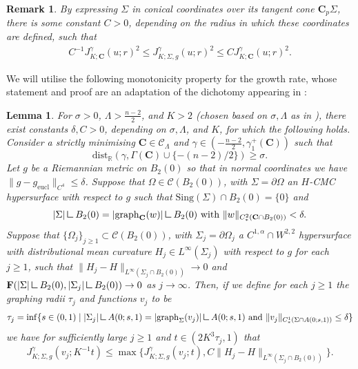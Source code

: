 \documentclass[12pt]{article}
\newtheorem{remark}{Remark}
\newtheorem{lemma}{Lemma}
\newcommand{\mres}{\mathbin{\vrule height 1.6ex depth 0pt width
0.13ex\vrule height 0.13ex depth 0pt width 1.3ex}}
\begin{document}
\begin{remark}\label{rem: J on cone to J on cmc} By expressing $\Sigma$ in conical coordinates over its tangent cone $\mathbf{C}_p\Sigma$, there is some constant $C > 0$, depending on the radius in which these coordinates are defined, such that
\begin{align*}
       C^{-1}J^{\gamma}_{K;\mathbf{C}}(u;r)^2 \leq J^{\gamma}_{K;\Sigma,g}(u;r)^2
\leq CJ^{\gamma}_{K;\mathbf{C}}(u;r)^2.
   \end{align*}
\end{remark}

We will utilise the following monotonicity property for the growth rate, whose statement and proof are an adaptation of the dichotomy appearing in \cite[Lemma F.5]{LW25}:

\begin{lemma}\label{lem: dichotomy adapted}
    For $\sigma > 0$, $\Lambda>\frac{n-2}{2}$, and $K > 2$ (chosen based on $\sigma,\Lambda$ as in \cite[Corollary 6.2]{LW25}), there exist constants $\delta, C > 0$, depending on $\sigma, \Lambda$, and $K$, for which the following holds. Consider a strictly minimising $\mathbf{C} \in \mathscr{C}_\Lambda$ and $\gamma \in (-\frac{n-2}{2}, \gamma_1^+(\mathbf{C}))$ such that
    $$
    \mathrm{dist}_{\mathbb{R}}\left(\gamma, \Gamma(\mathbf{C}) \cup \{-(n - 2)/2\}\right) \geq \sigma. 
    $$
    Let $g$ be a Riemannian metric on $B_2(0)$ so that in normal coordinates we have $\|g - g_{\mathrm{eucl}}\|_{C^4} \leq \delta$. Suppose that $\Omega \in \mathcal{C}(B_2(0))$, with $\Sigma = \partial \Omega$ an $H$-CMC hypersurface with respect to $g$ such that $\mathrm{Sing}(\Sigma) \cap B_2(0) = \{0\}$ and
    $$ |\Sigma| \mres B_2(0) = |\mathrm{graph}_\mathbf{C}(w)| \mres B_2(0) \text{ with } \|w\|_{C^2_*(\mathbf{C} \cap B_2(0))} < \delta.$$
    Suppose that $\{\Omega_j\}_{j \geq 1} \subset \mathcal{C}(B_2(0))$, with $\Sigma_j = \partial \Omega_j$ a $C^{1,\alpha} \cap W^{2,2}$ hypersurface with distributional mean curvature $H_j \in L^\infty(\Sigma_j)$ with respect to $g$ for each $j \geq 1$, such that $\|H_j - H\|_{L^\infty(\Sigma_j \cap B_2(0))} \rightarrow 0$ and $\mathbf{F}(|\Sigma|\mres B_2(0),|\Sigma_j| \mres B_2(0)) \rightarrow 0$ as $j \rightarrow \infty$. Then, if we define for each $j \geq 1$ the graphing radii $\tau_j$ and functions $v_j$ to be
    \begin{equation}\label{eqn: graphing radius adapted}
        \tau_j = \inf\{s \in (0,1) \mid |\Sigma_j| \mres A(0;s,1) = |\mathrm{graph}_{\Sigma}(v_j)| \mres A(0;s,1) \text{ and } \|v_j\|_{C^1_*(\Sigma \cap A(0;s,1))} \leq \delta \}
    \end{equation}
    we have for sufficiently large $j \geq 1$ and $t \in (2K^3\tau_j,1)$ that 
    \begin{equation}\label{eqn: J monotonicity with mean curvature difference}
        J^\gamma_{K;\Sigma,g}(v_j;K^{-1}t) \leq \max\{J^\gamma_{K;\Sigma,g}(v_j;t), C\|H_j - H\|_{L^\infty(\Sigma_j \cap B_2(0))}\}.
    \end{equation}
\end{lemma}
\end{document}
